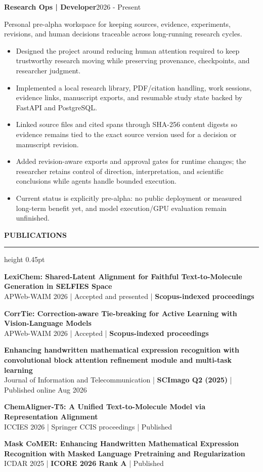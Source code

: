 \documentclass[10pt]{article}
\newcommand{\cvsection}[1]{%
    \vspace{6.2pt}%
    {\color{accent}\bfseries\small #1}\par
    \vspace{2.3pt}%
    {\color{rulegray}\hrule height 0.45pt}\vspace{4.0pt}%
}
\newcommand{\entry}[2]{%
    \textbf{#1}\hfill {\color{muted}\small #2}\par
}
\newcommand{\subentry}[1]{%
    {\color{muted}\small #1}\par
}
\begin{document}
\entry{Research Ops | Developer}{2026 - Present}
\subentry{Personal pre-alpha workspace for keeping sources, evidence, experiments, revisions, and human decisions traceable across long-running research cycles.}
\begin{itemize}
    \item Designed the project around reducing human attention required to keep trustworthy research moving while preserving provenance, checkpoints, and researcher judgment.
    \item Implemented a local research library, PDF/citation handling, work sessions, evidence links, manuscript exports, and resumable study state backed by FastAPI and PostgreSQL.
    \item Linked source files and cited spans through SHA-256 content digests so evidence remains tied to the exact source version used for a decision or manuscript revision.
    \item Added revision-aware exports and approval gates for runtime changes; the researcher retains control of direction, interpretation, and scientific conclusions while agents handle bounded execution.
    \item Current status is explicitly pre-alpha: no public deployment or measured long-term benefit yet, and model execution/GPU evaluation remain unfinished.
\end{itemize}

\cvsection{PUBLICATIONS}
\textbf{LexiChem: Shared-Latent Alignment for Faithful Text-to-Molecule Generation in SELFIES Space}\\[-1pt]
{\small APWeb-WAIM 2026 | Accepted and presented | \textbf{Scopus-indexed proceedings}}\par
\vspace{2.8pt}
\textbf{CorrTie: Correction-aware Tie-breaking for Active Learning with Vision-Language Models}\\[-1pt]
{\small APWeb-WAIM 2026 | Accepted | \textbf{Scopus-indexed proceedings}}\par
\vspace{2.8pt}
\textbf{Enhancing handwritten mathematical expression recognition with convolutional block attention refinement module and multi-task learning}\\[-1pt]
{\small Journal of Information and Telecommunication | \textbf{SCImago Q2 (2025)} | Published online Aug 2026}\par
\vspace{2.8pt}
\textbf{ChemAligner-T5: A Unified Text-to-Molecule Model via Representation Alignment}\\[-1pt]
{\small ICCIES 2026 | Springer CCIS proceedings | Published}\par
\vspace{2.8pt}
\textbf{Mask CoMER: Enhancing Handwritten Mathematical Expression Recognition with Masked Language Pretraining and Regularization}\\[-1pt]
{\small ICDAR 2025 | \textbf{ICORE 2026 Rank A} | Published}
\end{document}
